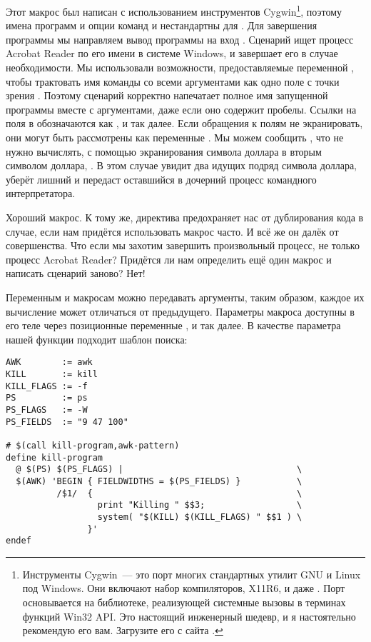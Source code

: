 Этот макрос был написан с использованием инструментов Cygwin\footnote{
Инструменты Cygwin~--- это порт многих стандартных утилит GNU и Linux
под Windows. Они включают набор компиляторов, X11R6,  и
даже . Порт основывается на библиотеке, реализующей
системные вызовы \UNIX{} в терминах функций Win32 API. Это настоящий
инженерный шедевр, и я настоятельно рекомендую его вам. Загрузите
его с сайта .
}, поэтому имена программ и опции команд  и 
нестандартны для \UNIX{}. Для завершения программы мы направляем вывод
программы  на вход . Сценарий 
ищет процесс Acrobat Reader по его имени в системе Windows, и
завершает его в случае необходимости. Мы использовали возможности,
предоставляемые переменной , чтобы трактовать имя
команды со всеми аргументами как одно поле с точки зрения
. Поэтому сценарий корректно напечатает полное имя
запущенной программы вместе с аргументами, даже если оно содержит
пробелы. Ссылки на поля в  обозначаются как
,  и так далее.  Если обращения к
полям не экранировать, они могут быть рассмотрены как переменные
\GNUmake{}. Мы можем сообщить \GNUmake{}, что  не
нужно вычислять, с помощью экранирования символа доллара в
 вторым символом доллара, .  В
этом случае \GNUmake{} увидит два идущих подряд символа доллара,
уберёт лишний и передаст оставшийся в дочерний процесс командного
интерпретатора. 

Хороший макрос. К тому же, директива  предохраняет
нас от дублирования кода в случае, если нам придётся использовать
макрос часто.  И всё же он далёк от совершенства. Что если мы захотим
завершить произвольный процесс, не только процесс Acrobat Reader?
Придётся ли нам определить ещё один макрос и написать сценарий заново?
Нет!

Переменным и макросам можно передавать аргументы, таким образом,
каждое их вычисление может отличаться от предыдущего. Параметры
макроса доступны в его теле через позиционные переменные
,  и так далее. В качестве параметра
нашей функции  подходит шаблон поиска:

{\footnotesize
\begin{verbatim}
AWK        := awk
KILL       := kill
KILL_FLAGS := -f
PS         := ps
PS_FLAGS   := -W
PS_FIELDS  := "9 47 100"

# $(call kill-program,awk-pattern)
define kill-program
  @ $(PS) $(PS_FLAGS) |                                  \
  $(AWK) 'BEGIN { FIELDWIDTHS = $(PS_FIELDS) }           \
          /$1/  {                                        \
                  print "Killing " $$3;                  \
                  system( "$(KILL) $(KILL_FLAGS) " $$1 ) \
                }'
endef
\end{verbatim}
}

